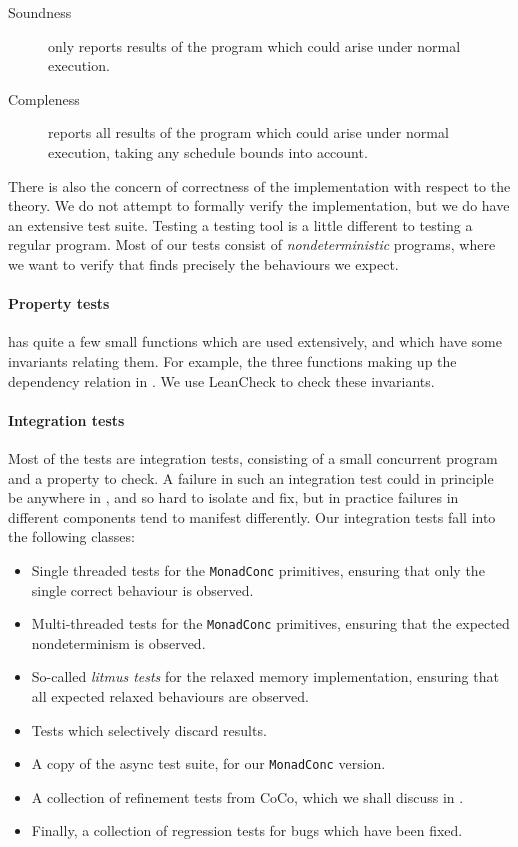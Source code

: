 \begin{description}
\item[Soundness] \dejafu{} only reports results of the program which
  could arise under normal execution.
\item[Compleness] \dejafu{} reports all results of the program which
  could arise under normal execution, taking any schedule bounds into
  account.
\end{description}

There is also the concern of correctness of the implementation with
respect to the theory.  We do not attempt to formally verify the
implementation, but we do have an extensive test suite.  Testing a
testing tool is a little different to testing a regular program.  Most
of our tests consist of \emph{nondeterministic} programs, where we
want to verify that \dejafu{} finds precisely the behaviours we
expect.

\paragraph{Property tests}
\dejafu{} has quite a few small functions which are used extensively,
and which have some invariants relating them.  For example, the three
functions making up the dependency relation in
.  We use LeanCheck\cite{leancheck} to check
these invariants.

\paragraph{Integration tests}
Most of the tests are integration tests, consisting of a small
concurrent program and a property to check.  A failure in such an
integration test could in principle be anywhere in \dejafu{}, and so
hard to isolate and fix, but in practice failures in different
components tend to manifest differently.  Our integration tests fall
into the following classes:

\begin{itemize}
\item Single threaded tests for the \verb|MonadConc| primitives,
  ensuring that only the single correct behaviour is observed.
\item Multi-threaded tests for the \verb|MonadConc| primitives,
  ensuring that the expected nondeterminism is observed.
\item So-called \emph{litmus tests} for the relaxed memory
  implementation, ensuring that all expected relaxed behaviours are
  observed.
\item Tests which selectively discard results.
\item A copy of the async\cite{async} test suite, for our
  \verb|MonadConc| version.
\item A collection of refinement tests from CoCo, which we shall
  discuss in .
\item Finally, a collection of regression tests for bugs which have
  been fixed.
\end{itemize}


